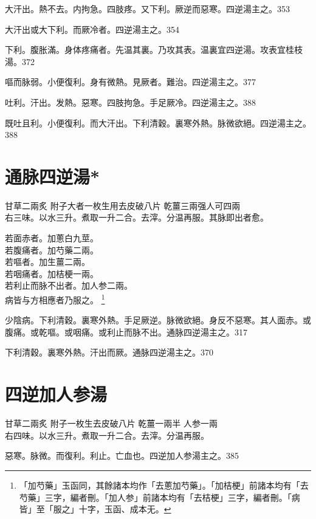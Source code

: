 大汗出。熱不去。内拘急。四肢疼。{\khaaitp 又}下利。厥逆而惡寒。四逆湯主之。353

大汗{\khaaitp 出}或大下利。而厥冷者。四逆湯主之。354

下利。腹{\khaaitp 胀}滿。身体疼痛者。先温其裏。乃攻其表。温裏宜四逆湯。攻表宜桂枝湯。372

嘔而脉弱。小便復利。身有微熱。見厥者。難治。四逆湯主之。377

吐利。汗出。发熱。惡寒。四肢拘急。手足厥冷。四逆湯主之。388

既吐且利。小便復利。而大汗出。下利清穀。裏寒外熱。脉微欲絕。四逆湯主之。388

\section{通脉四逆湯*}

甘草{\scriptsize 二兩炙} 附子{\scriptsize 大者一枚生用去皮破八片} 乾薑{\scriptsize 三兩强人可四兩}\\
右三味。以水三升。煮取一升二合。去滓。分温再服。其脉即出者愈。

{\khaaitp 若}面赤者。加蔥{\khaaitp 白}九莖。\\
{\khaaitp 若}腹痛者。加芍藥二兩。\\
{\khaaitp 若}嘔者。加生薑二兩。\\
{\khaaitp 若}咽痛者。加桔梗一兩。\\
{\khaaitp 若}利止而脉不出者。加人参二兩。\\
{\khaaitp 病皆与方相應者乃服之。}
	\footnote{「加芍藥」玉函同，其餘諸本均作「去蔥加芍藥」。「加桔梗」前諸本均有「去芍藥」三字，編者刪。「加人参」前諸本均有「去桔梗」三字，編者刪。「病皆」至「服之」十字，玉函、成本无。}

少陰病。下利清穀。裏寒外熱。手足厥逆。脉微欲絕。身反不惡寒。其人面赤。或腹痛。或乾嘔。或咽痛。或利止而脉不出。通脉四逆湯主之。317

下利清穀。裏寒外熱。汗出而厥。通脉四逆湯主之。370

\section{四逆加人参湯}

甘草{\scriptsize 二兩炙} 附子{\scriptsize 一枚生去皮破八片} 乾薑{\scriptsize 一兩半} 人参{\scriptsize 一兩}\\
右四味。以水三升。煮取一升二合。去滓。分温再服。

惡寒。脉微。而復利。利止。亡血也。四逆加人参湯主之。385

